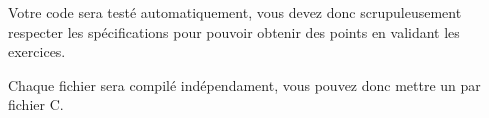 


\noindent Votre code sera testé automatiquement, vous devez donc scrupuleusement respecter les spécifications pour pouvoir obtenir des points en validant les exercices.
%
%

%
%
%
%
%

\noindent Chaque fichier sera compilé indépendament, vous pouvez donc mettre un  par fichier C.

